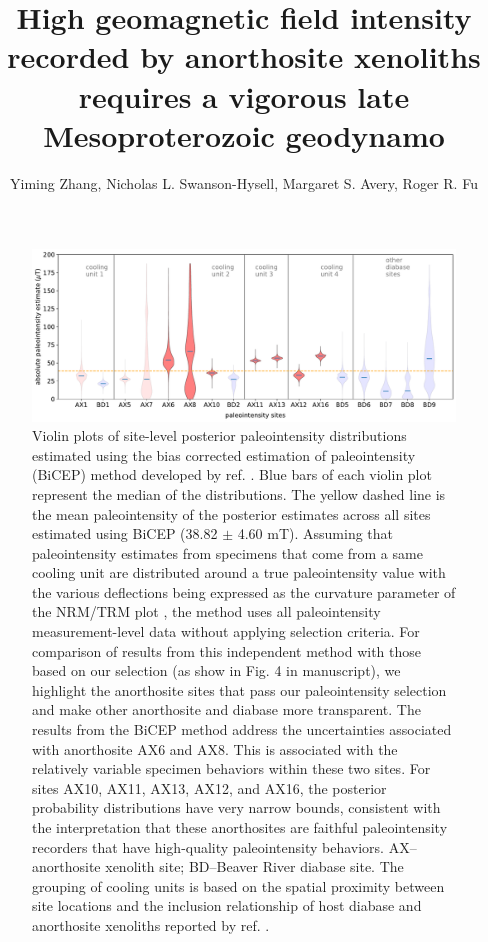 \documentclass[9pt,twoside]{pnas-new}
\title{High geomagnetic field intensity recorded by anorthosite xenoliths requires a vigorous late Mesoproterozoic geodynamo}
\author{Yiming Zhang, Nicholas L. Swanson-Hysell, Margaret S. Avery, Roger R. Fu}
\begin{document}
\maketitle



\begin{figure}[h!]
\noindent\includegraphics[width=17.8 cm]{PINT_BiCEP.pdf}
\centering
\caption{{Violin plots of site-level posterior paleointensity distributions estimated using the bias corrected estimation of paleointensity (BiCEP) method developed by ref. \citealp{Cych2021a}. Blue bars of each violin plot represent the median of the distributions. The yellow dashed line is the mean paleointensity of the posterior estimates across all sites estimated using BiCEP (38.82 $\pm$ 4.60 mT). Assuming that paleointensity estimates from specimens that come from a same cooling unit are distributed around a true paleointensity value with the various deflections being expressed as the curvature parameter of the NRM/TRM plot \cite{Arai1963a, Paterson2011a}, the method uses all paleointensity measurement-level data without applying selection criteria. For comparison of results from this independent method with those based on our selection (as show in Fig. 4 in manuscript), we highlight the anorthosite sites that pass our paleointensity selection and make other anorthosite and diabase more transparent. The results from the BiCEP method address the uncertainties associated with anorthosite AX6 and AX8. This is associated with the relatively variable specimen behaviors within these two sites. For sites AX10, AX11, AX13, AX12, and AX16, the posterior probability distributions have very narrow bounds, consistent with the interpretation that these anorthosites are faithful paleointensity recorders that have high-quality paleointensity behaviors. AX--anorthosite xenolith site; BD--Beaver River diabase site. The grouping of cooling units is based on the spatial proximity between site locations and the inclusion relationship of host diabase and anorthosite xenoliths reported by ref. \citealp{Zhang2021b}.}}
\label{fig:PINT_BiCEP}
\end{figure}
\end{document}

